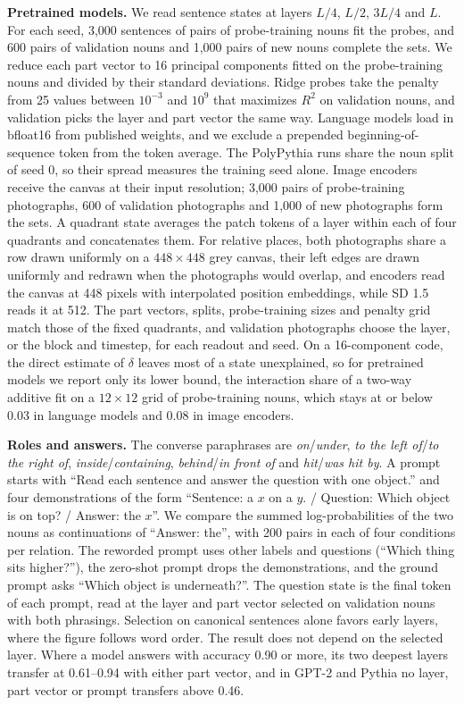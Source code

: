 \textbf{Pretrained models.} We read sentence states at layers $L/4$, $L/2$, $3L/4$ and $L$. For each seed, 3{,}000 sentences of pairs of probe-training nouns fit the probes, and 600 pairs of validation nouns and 1{,}000 pairs of new nouns complete the sets. We reduce each part vector to 16 principal components fitted on the probe-training nouns and divided by their standard deviations. Ridge probes take the penalty from 25 values between $10^{-3}$ and $10^{9}$ that maximizes $R^2$ on validation nouns, and validation picks the layer and part vector the same way. Language models load in bfloat16 from published weights, and we exclude a prepended beginning-of-sequence token from the token average. The PolyPythia runs share the noun split of seed 0, so their spread measures the training seed alone. Image encoders receive the canvas at their input resolution; 3{,}000 pairs of probe-training photographs, 600 of validation photographs and 1{,}000 of new photographs form the sets. A quadrant state averages the patch tokens of a layer within each of four quadrants and concatenates them. For relative places, both photographs share a row drawn uniformly on a $448 \times 448$ grey canvas, their left edges are drawn uniformly and redrawn when the photographs would overlap, and encoders read the canvas at 448 pixels with interpolated position embeddings, while SD 1.5 reads it at 512. The part vectors, splits, probe-training sizes and penalty grid match those of the fixed quadrants, and validation photographs choose the layer, or the block and timestep, for each readout and seed. On a 16-component code, the direct estimate of $\delta$ leaves most of a state unexplained, so for pretrained models we report only its lower bound, the interaction share of a two-way additive fit on a $12 \times 12$ grid of probe-training nouns, which stays at or below 0.03 in language models and 0.08 in image encoders.

\textbf{Roles and answers.} The converse paraphrases are \emph{on}/\emph{under}, \emph{to the left of}/\emph{to the right of}, \emph{inside}/\emph{containing}, \emph{behind}/\emph{in front of} and \emph{hit}/\emph{was hit by}. A prompt starts with ``Read each sentence and answer the question with one object.'' and four demonstrations of the form ``Sentence: a $x$ on a $y$. / Question: Which object is on top? / Answer: the $x$''. We compare the summed log-probabilities of the two nouns as continuations of ``Answer: the'', with 200 pairs in each of four conditions per relation. The reworded prompt uses other labels and questions (``Which thing sits higher?''), the zero-shot prompt drops the demonstrations, and the ground prompt asks ``Which object is underneath?''. The question state is the final token of each prompt, read at the layer and part vector selected on validation nouns with both phrasings. Selection on canonical sentences alone favors early layers, where the figure follows word order. The result does not depend on the selected layer. Where a model answers with accuracy 0.90 or more, its two deepest layers transfer at 0.61--0.94 with either part vector, and in GPT-2 and Pythia no layer, part vector or prompt transfers above 0.46.

